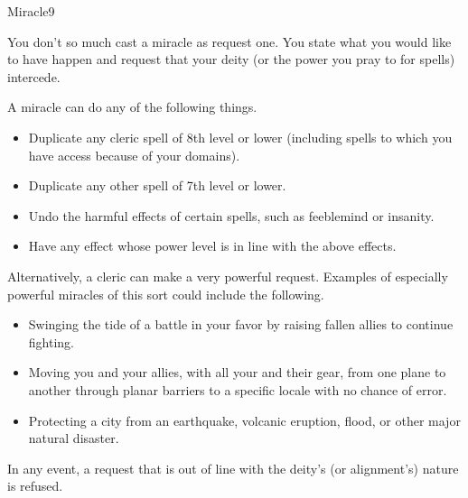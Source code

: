 \begin{spellsection}{Miracle}{9}
    \begin{spellheader}
    \end{spellheader}
    \begin{spellcontent}
        \begin{spelltargetinginfo}
        \end{spelltargetinginfo}
        \begin{spelleffects}
            \spelleffect You don't so much cast a miracle as request one. You state what you would like to have happen and request that your deity (or the power you pray to for spells) intercede.
            \par A miracle can do any of the following things.
            \begin{itemize}
                \item Duplicate any cleric spell of 8th level or lower (including spells to which you have access because of your domains). 
                \item Duplicate any other spell of 7th level or lower.
                \item Undo the harmful effects of certain spells, such as feeblemind or insanity.
                \item Have any effect whose power level is in line with the above effects.
            \end{itemize}
            \par Alternatively, a cleric can make a very powerful request. Examples of especially powerful miracles of this sort could include the following.
            \begin{itemize}
                \item Swinging the tide of a battle in your favor by raising fallen allies to continue fighting.
                \item Moving you and your allies, with all your and their gear, from one plane to another through planar barriers to a specific locale with no chance of error.
                \item Protecting a city from an earthquake, volcanic eruption, flood, or other major natural disaster.
            \end{itemize}
            \par In any event, a request that is out of line with the deity's (or alignment's) nature is refused.

\end{spelleffects}
\end{spellcontent}
\end{spellsection}
